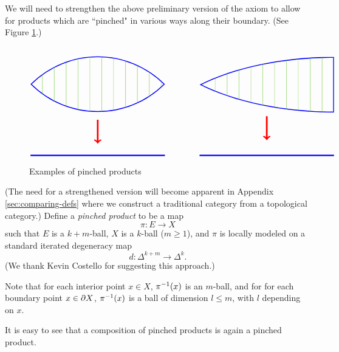 We will need to strengthen the above preliminary version of the axiom to allow
for products which are ``pinched" in various ways along their boundary.
(See Figure \ref{pinched_prods}.)
\begin{figure}[t]
$$
\begin{tikzpicture}[baseline=0]
\begin{scope}
\path[clip] (0,0) arc (135:45:4) arc (-45:-135:4);
\draw[blue,line width=2pt] (0,0) arc (135:45:4) arc (-45:-135:4);
\foreach \x in {0, 0.5, ..., 6} {
	\draw[green!50!brown] (\x,-2) -- (\x,2);
}
\end{scope}
\draw[blue,line width=1.5pt] (0,-3) -- (5.66,-3);
\draw[->,red,line width=2pt] (2.83,-1.5) -- (2.83,-2.5);
\end{tikzpicture}
\qquad \qquad
\begin{tikzpicture}[baseline=-0.15cm]
\begin{scope}
\path[clip] (0,1) arc (90:135:8 and 4)  arc (-135:-90:8 and 4) -- cycle;
\draw[blue,line width=2pt] (0,1) arc (90:135:8 and 4)  arc (-135:-90:8 and 4) -- cycle;
\foreach \x in {-6, -5.5, ..., 0} {
	\draw[green!50!brown] (\x,-2) -- (\x,2);
}
\end{scope}
\draw[blue,line width=1.5pt] (-5.66,-3.15) -- (0,-3.15);
\draw[->,red,line width=2pt] (-2.83,-1.5) -- (-2.83,-2.5);
\end{tikzpicture}
$$
\caption{Examples of pinched products}\label{pinched_prods}
\end{figure}
(The need for a strengthened version will become apparent in Appendix \ref{sec:comparing-defs}
where we construct a traditional category from a topological category.)
Define a {\it pinched product} to be a map
\[
	\pi: E\to X
\]
such that $E$ is a $k{+}m$-ball, $X$ is a $k$-ball ($m\ge 1$), and $\pi$ is locally modeled
on a standard iterated degeneracy map
\[
	d: \Delta^{k+m}\to\Delta^k .
\]
(We thank Kevin Costello for suggesting this approach.)

Note that for each interior point $x\in X$, $\pi^{-1}(x)$ is an $m$-ball,
and for for each boundary point $x\in\partial X$, $\pi^{-1}(x)$ is a ball of dimension
$l \le m$, with $l$ depending on $x$.

It is easy to see that a composition of pinched products is again a pinched product.

